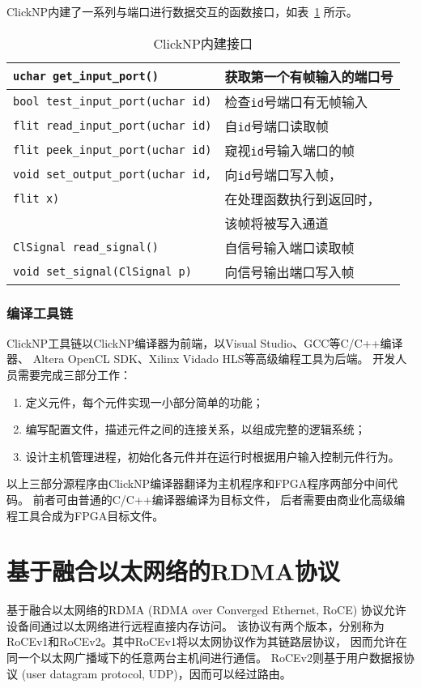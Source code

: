 ClickNP内建了一系列与端口进行数据交互的函数接口，如表~\ref{tab:operations} 所示。
\begin{table}[htbp]
\centering
\caption{ClickNP内建接口}\label{tab:operations}
\begin{tabular}{l l}
\toprule
\lstinline$uchar get_input_port()$         & 获取第一个有帧输入的端口号 \\
\midrule
\lstinline$bool test_input_port(uchar id)$ & 检查\lstinline$id$号端口有无帧输入 \\
\midrule
\lstinline$flit read_input_port(uchar id)$ & 自\lstinline$id$号端口读取帧 \\
\midrule
\lstinline$flit peek_input_port(uchar id)$ & 窥视\lstinline$id$号输入端口的帧 \\
\midrule
\lstinline$void set_output_port(uchar id,$ & 向\lstinline$id$号端口写入帧， \\
\lstinline$flit x)$                        & 在处理函数执行到返回时， \\
                                           & 该帧将被写入通道 \\
\midrule
\lstinline$ClSignal read_signal()$         & 自信号输入端口读取帧 \\
\midrule
\lstinline$void set_signal(ClSignal p)$    & 向信号输出端口写入帧 \\
\bottomrule
\end{tabular}
\end{table}

\subsubsection{编译工具链}
ClickNP工具链以ClickNP编译器为前端，以Visual Studio、GCC等C/C++编译器、
Altera OpenCL SDK、Xilinx Vidado HLS等高级编程工具为后端。
开发人员需要完成三部分工作：
\begin{enumerate}
\item 定义元件，每个元件实现一小部分简单的功能；
\item 编写配置文件，描述元件之间的连接关系，以组成完整的逻辑系统；
\item 设计主机管理进程，初始化各元件并在运行时根据用户输入控制元件行为。
\end{enumerate}

以上三部分源程序由ClickNP编译器翻译为主机程序和FPGA程序两部分中间代码。
前者可由普通的C/C++编译器编译为目标文件，
后者需要由商业化高级编程工具合成为FPGA目标文件。



\section{基于融合以太网络的RDMA协议}
基于融合以太网络的RDMA (RDMA over Converged Ethernet, RoCE) 协议允许设备间通过以太网络进行远程直接内存访问。
该协议有两个版本，分别称为RoCEv1和RoCEv2。其中RoCEv1将以太网协议作为其链路层协议，
因而允许在同一个以太网广播域下的任意两台主机间进行通信\cite{a16}。
RoCEv2则基于用户数据报协议 (user datagram protocol, UDP)，因而可以经过路由\cite{a17, considerations, storage}。

